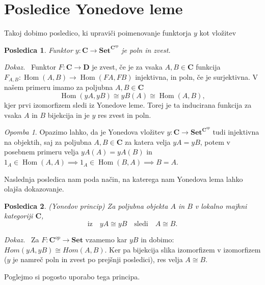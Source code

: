 \documentclass[12pt,a4paper]{book}
\theoremstyle{definition}
\theoremstyle{plain}
\newtheorem{posledica}{Posledica}[definicija]
\newenvironment{dokaz}{\emph{Dokaz.}\ }{\hspace{\fill}{$\Box$}}
\theoremstyle{definition}
\theoremstyle{remark}
\newtheorem*{opomba}{Opomba}
\newcommand{\cat}[1]{\textbf{#1}}
\DeclareMathOperator{\Hom}{Hom}
\begin{document}
\section{Posledice Yonedove leme}

Takoj dobimo posledico, ki upraviči poimenovanje funktorja $y$ kot vložitev
\begin{posledica} Funktor $y : \cat{C} \to \cat{Set}^{\cat{C}^{op}}$ je poln in zvest.
\end{posledica}
\begin{dokaz}
Funktor $F:\cat{C} \to \cat{D}$ je zvest, če je za vsaka $A,B \in \cat{C}$ funkcija $F_{A,B} : \Hom(A,B) \to \Hom(FA,FB)$ injektivna, in poln, če je surjektivna.
V našem primeru imamo za poljubna $A,B \in \cat{C}$ 
$$\Hom(yA,yB) \cong yB(A) \cong \Hom(A,B),$$
kjer prvi izomorfizem sledi iz Yonedove leme. Torej je ta inducirana funkcija za vsaka $A$ in $B$ bijekcija in je $y$ res zvest in poln.
\end{dokaz}
\begin{opomba}
Opazimo lahko, da je Yonedova vložitev $y : \cat{C} \to \cat{Set}^{\cat{C}^{op}}$ tudi injektivna na objektih, saj za poljubna $A,B \in \cat{C}$ za katera velja $yA = yB$, potem v posebnem primeru velja $yA(A) = yA(B)$ in $1_A \in \Hom(A,A) \implies 1_A \in \Hom(B,A) \implies B = A$.
\end{opomba}


Naslednja posledica nam poda način, na katerega nam Yonedova lema lahko olajša dokazovanje.

\begin{posledica} \emph{(Yonedov princip)}
Za poljubna objekta $A$ in $B$ v lokalno majhni kategoriji $\cat{C}$,
$$\text{iz} \quad yA \cong yB \quad\text{sledi}\quad A \cong B .$$
\end{posledica}
\begin{dokaz}
Za $F : \cat{C}^{op} \to \cat{Set}$ vzamemo kar $yB$ in dobimo: $Hom(yA,yB) \cong Hom(A,B)$. Ker pa bijekcija slika izomorfizem v izomorfizem ($y$ je namreč poln in zvest po prejšnji posledici), res velja $A \cong B$.
\end{dokaz}


Poglejmo si pogosto uporabo tega principa.
\end{document}
